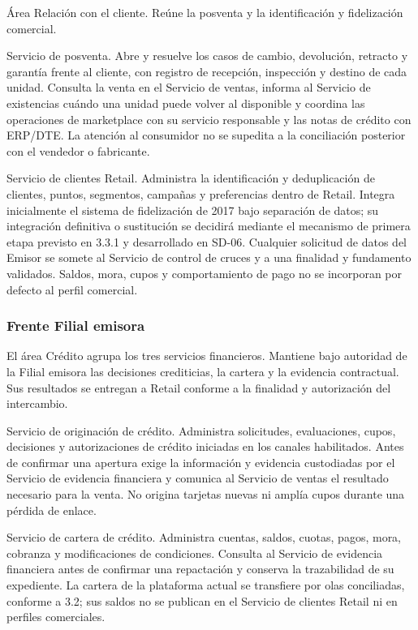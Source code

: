 \documentclass[11pt]{article}
\begin{document}
{Área Relación con el cliente. Reúne la posventa y la identificación y fidelización comercial.}

{Servicio de posventa. Abre y resuelve los casos de cambio, devolución, retracto y garantía frente al cliente, con registro de recepción, inspección y destino de cada unidad. Consulta la venta en el Servicio de ventas, informa al Servicio de existencias cuándo una unidad puede volver al disponible y coordina las operaciones de marketplace con su servicio responsable y las notas de crédito con ERP/DTE. La atención al consumidor no se supedita a la conciliación posterior con el vendedor o fabricante.}

{Servicio de clientes Retail. Administra la identificación y deduplicación de clientes, puntos, segmentos, campañas y preferencias dentro de Retail. Integra inicialmente el sistema de fidelización de 2017 bajo separación de datos; su integración definitiva o sustitución se decidirá mediante el mecanismo de primera etapa previsto en 3.3.1 y desarrollado en SD-06. Cualquier solicitud de datos del Emisor se somete al Servicio de control de cruces y a una finalidad y fundamento validados. Saldos, mora, cupos y comportamiento de pago no se incorporan por defecto al perfil comercial.}

\subsubsection{Frente Filial emisora}

{El área Crédito agrupa los tres servicios financieros. Mantiene bajo autoridad de la Filial emisora las decisiones crediticias, la cartera y la evidencia contractual. Sus resultados se entregan a Retail conforme a la finalidad y autorización del intercambio.}

{Servicio de originación de crédito. Administra solicitudes, evaluaciones, cupos, decisiones y autorizaciones de crédito iniciadas en los canales habilitados. Antes de confirmar una apertura exige la información y evidencia custodiadas por el Servicio de evidencia financiera y comunica al Servicio de ventas el resultado necesario para la venta. No origina tarjetas nuevas ni amplía cupos durante una pérdida de enlace.}

{Servicio de cartera de crédito. Administra cuentas, saldos, cuotas, pagos, mora, cobranza y modificaciones de condiciones. Consulta al Servicio de evidencia financiera antes de confirmar una repactación y conserva la trazabilidad de su expediente. La cartera de la plataforma actual se transfiere por olas conciliadas, conforme a 3.2; sus saldos no se publican en el Servicio de clientes Retail ni en perfiles comerciales.}
\end{document}
